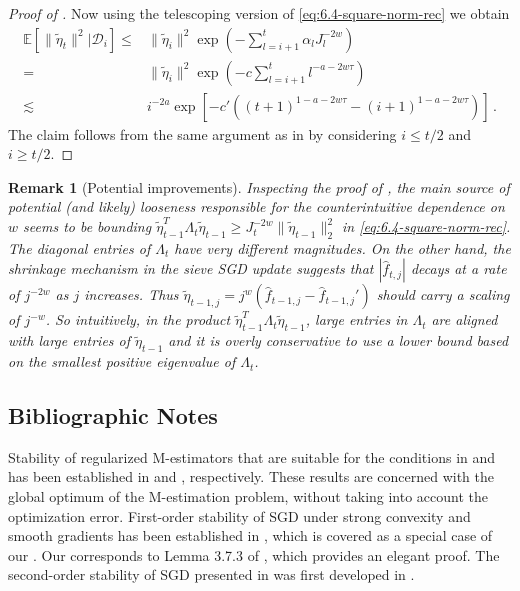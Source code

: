 \documentclass[11pt]{article}
\theoremstyle{plain}
\newtheorem{remark}[theorem]{Remark}
\newcommand{\D}{{\mathcal{D}}}
\begin{document}
\begin{proof}[Proof of ]
Now using the telescoping version of \eqref{eq:6.4-square-norm-rec} we obtain
\begin{align*}
    \mathbb E\left[\|\tilde\eta_t\|^2\big|\D_i\right]\le &\|\tilde\eta_i\|^2\exp\left(-\sum_{l=i+1}^t\alpha_l J_l^{-2w}\right)\nonumber\\
    =&\|\tilde\eta_i\|^2\exp\left(-c\sum_{l=i+1}^t l^{-a-2w\tau}\right)\nonumber\\
    \lesssim &i^{-2a}\exp\left[-c'\left((t+1)^{1-a-2w\tau}-(i+1)^{1-a-2w\tau}\right)\right]\,.
\end{align*}
The claim follows from the same argument as in  by considering $i\le t/2$ and $i\ge t/2$.
\end{proof}

\begin{remark}[Potential improvements]
Inspecting the proof of , the main source of potential (and likely) looseness responsible for the counterintuitive dependence on $w$ seems to be bounding 
$\tilde\eta_{t-1}^T\Lambda_t\tilde\eta_{t-1}\ge J_t^{-2w}\|\tilde\eta_{t-1}\|_2^2$
in \eqref{eq:6.4-square-norm-rec}.  The diagonal entries of $\Lambda_t$ have very different magnitudes. On the other hand, the shrinkage mechanism in the sieve SGD update suggests that $|\hat f_{t,j}|$ decays at a rate of $j^{-2w}$ as $j$ increases.  Thus $\tilde\eta_{t-1,j}=j^w(\hat f_{t-1,j}-\hat f_{t-1,j}')$ should carry a scaling of $j^{-w}$.  So intuitively, in the product $\tilde\eta_{t-1}^T\Lambda_t\tilde\eta_{t-1}$, large entries in $\Lambda_t$ are aligned with large entries of $\tilde\eta_{t-1}$ and it is overly conservative to use a lower bound based on the smallest positive eigenvalue of $\Lambda_t$.
\end{remark}
\subsection{Bibliographic Notes}\label{subsec:6.6-bib}
Stability of regularized M-estimators that are suitable for the conditions in  and  has been established in \cite{bousquet2002stability} and \cite{austern2020}, respectively.  These results are concerned with the global optimum of the M-estimation problem, without taking into account the optimization error. First-order stability of SGD under strong convexity and smooth gradients has been established in \cite{hardt2016train}, which is covered as a special case of our .  Our  corresponds to Lemma 3.7.3 of \cite{hardt2016train}, which provides an elegant proof. The second-order stability of SGD presented in  was first developed in \cite{kissel2022high}.
\end{document}

